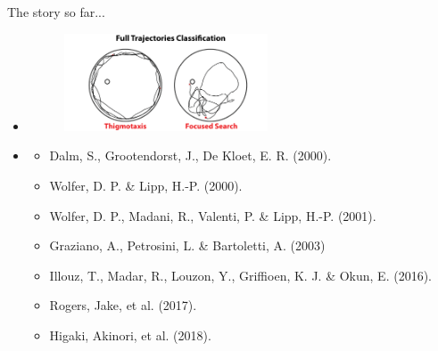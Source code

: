 \documentclass{beamer}
\newlength{\tmpShadow}
\newcommand{\MyShadow}[2]{%
	\settowidth{\tmpShadow}{#1}
	\addtolength{\tmpShadow}{.1em}
	\raisebox{-0.25ex}{\textcolor{gray!70}{#1}}%
	\kern-\tmpShadow%
	\textcolor{#2}{#1}%
}
\begin{document}
{\begin{frame}{The story so far...}
\begin{multicols}{2}
	\begin{itemize}
		\item<1->
		\begin{figure}[H]
			\centering
			\includegraphics[width=0.57\textwidth]{figures/others}
		\end{figure}	
		\vspace{4mm}	
		\item<2->
		\small{
		\begin{itemize}[label={\MyShadow{$\bullet$}{blue!80}}]
			\item Dalm, S., Grootendorst, J., De Kloet, E. R. (2000).
			\vspace{1.2mm}	
			\item Wolfer, D. P. \& Lipp, H.-P. (2000).
			\vspace{1.2mm}
			\item Wolfer, D. P., Madani, R., Valenti, P. \& Lipp, H.-P. (2001).
			\vspace{1.2mm}
			\item Graziano, A., Petrosini, L. \& Bartoletti, A. (2003)
			\vspace{1.2mm}
			\item Illouz, T., Madar, R., Louzon, Y., Griffioen, K. J. \& Okun, E. (2016).
			\vspace{1.2mm}
			\item Rogers, Jake, et al. (2017).
			\vspace{1.2mm}
			\item Higaki, Akinori, et al. (2018).
		\end{itemize}	
		}	
	\end{itemize}
\end{multicols}	
\end{frame}

}
\end{document}
